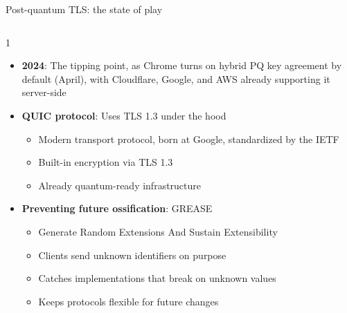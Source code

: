 \ifdefined\PRESENTATION\else\PassOptionsToClass{handout}{beamer}\fi\documentclass[aspectratio=169, lualatex]{beamer}
\begin{document}
\begin{frame}{Post-quantum TLS: the state of play}
	\begin{columns}[c]
		\begin{column}{1\textwidth}
			\begin{itemize}
				\item \textbf{2024}: The tipping point, as Chrome turns on hybrid PQ key agreement by default (April), with Cloudflare, Google, and AWS already supporting it server-side
				\item \textbf{QUIC protocol}: Uses TLS 1.3 under the hood
				      \begin{itemize}
					      \item Modern transport protocol, born at Google, standardized by the IETF
					      \item Built-in encryption via TLS 1.3
					      \item Already quantum-ready infrastructure
				      \end{itemize}
				\item \textbf{Preventing future ossification}: GREASE
				      \begin{itemize}
					      \item Generate Random Extensions And Sustain Extensibility
					      \item Clients send unknown identifiers on purpose
					      \item Catches implementations that break on unknown values
					      \item Keeps protocols flexible for future changes
				      \end{itemize}
			\end{itemize}
		\end{column}
	\end{columns}
\end{frame}
\end{document}
